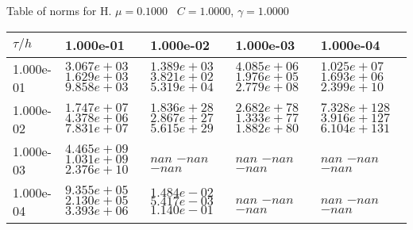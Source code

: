 \begin{center}
Table of norms for H. $\mu = 0.1000$ \, $C = 1.0000$, $\gamma = 1.0000$
  
\begin{tabular}{|p{1in}|p{1in}|p{1in}|p{1in}|p{1in}|} \hline
$\tau / h$ &1.000e-01 &1.000e-02 &1.000e-03 &1.000e-04 \\ \hline 
1.000e-01 & $3.067e+03$  $1.629e+03$  $9.858e+03$  & $1.389e+03$  $3.821e+02$  $5.319e+04$  & $4.085e+06$  $1.976e+05$  $2.779e+08$  & $1.025e+07$  $1.693e+06$  $2.399e+10$  \\ \hline 
1.000e-02 & $1.747e+07$  $4.378e+06$  $7.831e+07$  & $1.836e+28$  $2.867e+27$  $5.615e+29$  & $2.682e+78$  $1.333e+77$  $1.882e+80$  & $7.328e+128$  $3.916e+127$  $6.104e+131$  \\ \hline 
1.000e-03 & $4.465e+09$  $1.031e+09$  $2.376e+10$  & $nan$  $-nan$  $-nan$  & $nan$  $-nan$  $-nan$  & $nan$  $-nan$  $-nan$  \\ \hline 
1.000e-04 & $9.355e+05$  $2.130e+05$  $3.393e+06$  & $1.484e-02$  $5.417e-03$  $1.140e-01$  & $nan$  $-nan$  $-nan$  & $nan$  $-nan$  $-nan$  \\ \hline 

\end{tabular}\\[20pt]
\end{center}
